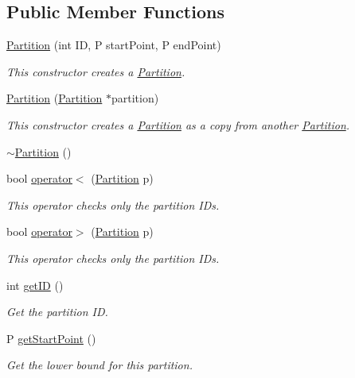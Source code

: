\subsection*{Public Member Functions}
\begin{DoxyCompactItemize}
\item 
\hyperlink{classPartition_abfef02ae361bd24d9648270f0de5790f}{Partition} (int ID, P start\+Point, P end\+Point)
\begin{DoxyCompactList}\small\item\em This constructor creates a \hyperlink{classPartition}{Partition}. \end{DoxyCompactList}\item 
\hyperlink{classPartition_a45b2a3119be4fe1b735547044df96f74}{Partition} (\hyperlink{classPartition}{Partition} $\ast$partition)
\begin{DoxyCompactList}\small\item\em This constructor creates a \hyperlink{classPartition}{Partition} as a copy from another \hyperlink{classPartition}{Partition}. \end{DoxyCompactList}\item 
\hyperlink{classPartition_a2bf066d3121bf800e82cebd4cb2f4ab7}{$\sim$\+Partition} ()
\item 
bool \hyperlink{classPartition_ab216a6422a087c09f621051d07d517dd}{operator$<$} (\hyperlink{classPartition}{Partition} p)
\begin{DoxyCompactList}\small\item\em This operator checks only the partition I\+Ds. \end{DoxyCompactList}\item 
bool \hyperlink{classPartition_aa241e87f540bd76b2c4733f40fdb7f2f}{operator$>$} (\hyperlink{classPartition}{Partition} p)
\begin{DoxyCompactList}\small\item\em This operator checks only the partition I\+Ds. \end{DoxyCompactList}\item 
int \hyperlink{classPartition_a3d9ce01ee6fbc781a9fa7c02adeda3e6}{get\+ID} ()
\begin{DoxyCompactList}\small\item\em Get the partition ID. \end{DoxyCompactList}\item 
P \hyperlink{classPartition_a418e5b08580b3c1d33390a13eeb8eb0f}{get\+Start\+Point} ()
\begin{DoxyCompactList}\small\item\em Get the lower bound for this partition. \end{DoxyCompactList}\item 

\end{DoxyCompactItemize}

